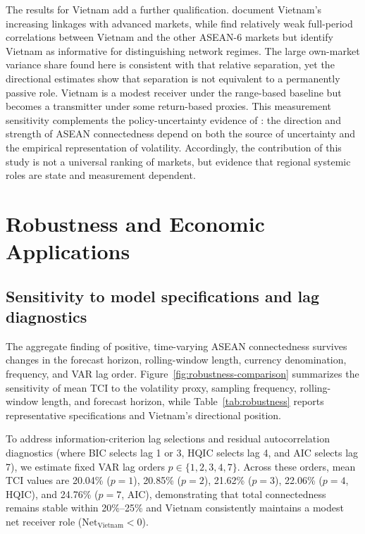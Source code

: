 \documentclass[12pt,a4paper]{article}
\begin{document}
The results for Vietnam add a further qualification. \citet{VoEllis2018} document Vietnam's increasing linkages with advanced markets, while \citet{AlAnshari2025} find relatively weak full-period correlations between Vietnam and the other ASEAN-6 markets but identify Vietnam as informative for distinguishing network regimes. The large own-market variance share found here is consistent with that relative separation, yet the directional estimates show that separation is not equivalent to a permanently passive role. Vietnam is a modest receiver under the range-based baseline but becomes a transmitter under some return-based proxies. This measurement sensitivity complements the policy-uncertainty evidence of \citet{HoqueEtAl2026}: the direction and strength of ASEAN connectedness depend on both the source of uncertainty and the empirical representation of volatility. Accordingly, the contribution of this study is not a universal ranking of markets, but evidence that regional systemic roles are state and measurement dependent.

\section{Robustness and Economic Applications}
\label{sec:robustness}

\subsection{Sensitivity to model specifications and lag diagnostics}

The aggregate finding of positive, time-varying ASEAN connectedness survives changes in the forecast horizon, rolling-window length, currency denomination, frequency, and VAR lag order. Figure~\ref{fig:robustness-comparison} summarizes the sensitivity of mean TCI to the volatility proxy, sampling frequency, rolling-window length, and forecast horizon, while Table~\ref{tab:robustness} reports representative specifications and Vietnam's directional position. 

To address information-criterion lag selections and residual autocorrelation diagnostics (where BIC selects lag 1 or 3, HQIC selects lag 4, and AIC selects lag 7), we estimate fixed VAR lag orders $p \in \{1, 2, 3, 4, 7\}$. Across these orders, mean TCI values are 20.04\% ($p=1$), 20.85\% ($p=2$), 21.62\% ($p=3$), 22.06\% ($p=4$, HQIC), and 24.76\% ($p=7$, AIC), demonstrating that total connectedness remains stable within 20\%--25\% and Vietnam consistently maintains a modest net receiver role ($\text{Net}_{\text{Vietnam}} < 0$).
\end{document}
